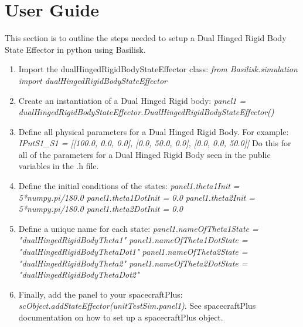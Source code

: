 \section{User Guide}

This section is to outline the steps needed to setup a Dual Hinged Rigid Body State Effector in python using Basilisk.

\begin{enumerate}
	\item Import the dualHingedRigidBodyStateEffector class: \newline \textit{from Basilisk.simulation import dualHingedRigidBodyStateEffector}
	\item Create an instantiation of a Dual Hinged Rigid body: \newline \textit{panel1 = dualHingedRigidBodyStateEffector.DualHingedRigidBodyStateEffector()}
	\item Define all physical parameters for a Dual Hinged Rigid Body. For example: \newline
	\textit{IPntS1\_S1 = [[100.0, 0.0, 0.0], [0.0, 50.0, 0.0], [0.0, 0.0, 50.0]]}
	Do this for all of the parameters for a Dual Hinged Rigid Body seen in the public variables in the .h file.
	\item Define the initial conditions of the states:\newline
	\textit{panel1.theta1Init = 5*numpy.pi/180.0 \quad panel1.theta1DotInit = 0.0 \newline panel1.theta2Init = 5*numpy.pi/180.0 \quad panel1.theta2DotInit = 0.0}
	\item Define a unique name for each state:\newline
	\textit{panel1.nameOfTheta1State = "dualHingedRigidBodyTheta1" \quad panel1.nameOfTheta1DotState = "dualHingedRigidBodyThetaDot1" \newline panel1.nameOfTheta2State = "dualHingedRigidBodyTheta2" \quad panel1.nameOfTheta2DotState = "dualHingedRigidBodyThetaDot2"}
	\item Finally, add the panel to your spacecraftPlus:\newline
	\textit{scObject.addStateEffector(unitTestSim.panel1)}. See spacecraftPlus documentation on how to set up a spacecraftPlus object. 
\end{enumerate}
